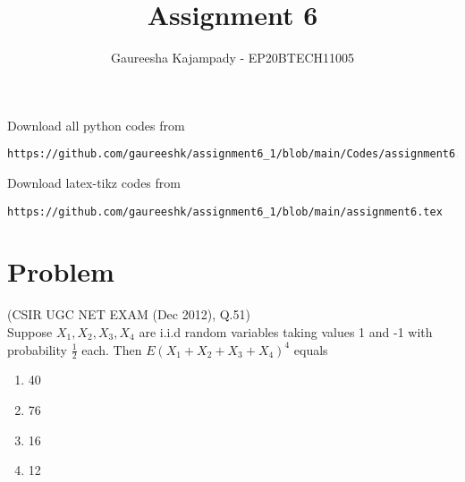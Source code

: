 \documentclass[journal,12pt,twocolumn]{IEEEtran}
\begin{document}
\def\putbox#1#2#3{\makebox[0in][l]{\makebox[#1][l]{}\raisebox{\baselineskip}[0in][0in]{\raisebox{#2}[0in][0in]{#3}}}}
     \def\rightbox#1{\makebox[0in][r]{#1}}  
     \def\centbox#1{\makebox[0in]{#1}}
     \def\topbox#1{\raisebox{-\baselineskip}[0in][0in]{#1}}
     \def\midbox#1{\raisebox{-0.5\baselineskip}[0in][0in]{#1}}
\vspace{3cm}
\title{Assignment 6}
\author{Gaureesha Kajampady - EP20BTECH11005}
\maketitle  
\newpage
\bigskips
\renewcommand{\thefigure}{\theenumi}
\renewcommand{\thetable}{\theenumi}
Download all python codes from 
\begin{lstlisting}
https://github.com/gaureeshk/assignment6_1/blob/main/Codes/assignment6.py
\end{lstlisting}
%
Download latex-tikz codes from 
%
\begin{lstlisting}
https://github.com/gaureeshk/assignment6_1/blob/main/assignment6.tex
\end{lstlisting}
\section{Problem}
(CSIR UGC NET EXAM (Dec 2012), Q.51)\\
Suppose $X_{1}, X_{2}, X_{3}, X_{4}$ are i.i.d random variables taking values 1 and -1 with probability $\frac{1}{2}$ each. Then $E(X_{1}+X_{2}+X_{3}+X_{4})^{4}$ equals
\begin{enumerate}
    \item{40}\\
    \item{76}\\
     \item{16}\\
      \item{12}\\
\end{enumerate}
\end{document}
